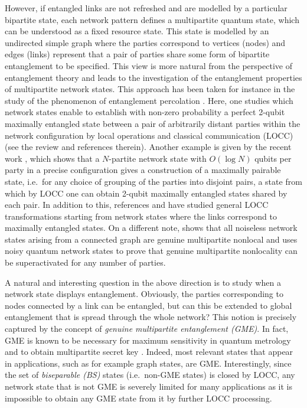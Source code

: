 \documentclass[a4paper,onecolumn,accepted=2024-12-14]{quantumarticle}
\theoremstyle{plain}
\begin{document}
However, if entangled links are not refreshed and are modelled by a particular bipartite state, each network pattern defines a multipartite quantum state, which can be understood as a fixed resource state. This state is modelled by an undirected simple graph where the parties correspond to vertices (nodes) and edges (links) represent that a pair of parties share some form of bipartite entanglement to be specified. This view is more natural from the perspective of entanglement theory and leads to the investigation of the entanglement properties of multipartite network states. This approach has been taken for instance in the study of the phenomenon of entanglement percolation \cite{percolation}. Here, one studies which network states enable to establish with non-zero probability a perfect 2-qubit maximally entangled state between a pair of arbitrarily distant parties within the network configuration by local operations and classical communication (LOCC) (see the review \cite{percolationreview} and references therein). Another example is given by the recent work \cite{pairable}, which shows that a $N$-partite network state with $O(\log N)$ qubits per party in a precise configuration gives a construction of a maximally pairable state, i.e.\ for any choice of grouping of the parties into disjoint pairs, a state from which by LOCC one can obtain 2-qubit maximally entangled states shared by each pair. In addition to this, references \cite{yamasaki} and \cite{kraftspee} have studied general LOCC transformations starting from network states where the links correspond to maximally entangled states. On a different note, \cite{networkGMNL} shows that all noiseless network states arising from a connected graph are genuine multipartite nonlocal and \cite{ASGME} uses noisy quantum network states to prove that genuine multipartite nonlocality can be superactivated for any number of parties.

A natural and interesting question in the above direction is to study when a network state displays entanglement. Obviously, the parties corresponding to nodes connected by a link can be entangled, but can this be extended to global entanglement that is spread through the whole network? This notion is precisely captured by the concept of \textit{genuine multipartite entanglement (GME)}. In fact, GME is known to be necessary for maximum sensitivity in quantum metrology \cite{gmesensing1,gmesensing2} and to obtain multipartite secret key \cite{gmekey}. Indeed, most relevant states that appear in applications, such as for example graph states, are GME. Interestingly, since the set of \textit{biseparable (BS)} states (i.e.\ non-GME states) is closed by LOCC, any network state that is not GME is severely limited for many applications as it is impossible to obtain any GME state from it by further LOCC processing.
\end{document}
